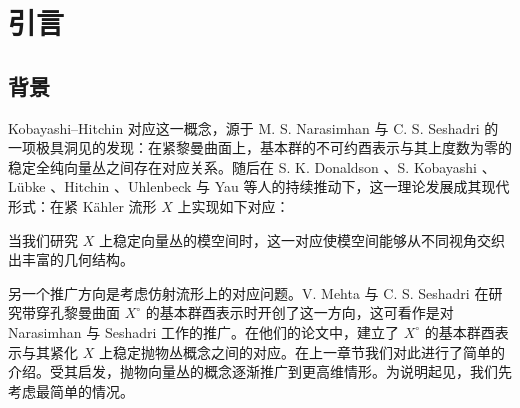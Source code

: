 \chapter{引言}
\section{背景}

Kobayashi--Hitchin 对应这一概念，源于 M. S. Narasimhan 与 C. S. Seshadri \cite{Na-Se} 的一项极具洞见的发现：在紧黎曼曲面上，基本群的不可约酉表示与其上度数为零的稳定全纯向量丛之间存在对应关系。随后在 S. K. Donaldson \cite{Do1,Do2}、S. Kobayashi \cite{Ko1,Ko2}、L\"ubke \cite{Lu}、Hitchin \cite{Hc}、Uhlenbeck 与 Yau \cite{Uh-Yau} 等人的持续推动下，这一理论发展成其现代形式：在紧 Kähler 流形 \(X\) 上实现如下对应：
\vspace{1pt}
\begin{center}
\end{center}
\vspace{1pt}
当我们研究 \(X\) 上稳定向量丛的模空间时，这一对应使模空间能够从不同视角交织出丰富的几何结构。

另一个推广方向是考虑仿射流形上的对应问题。V. Mehta 与 C. S. Seshadri \cite{Me-Se} 在研究带穿孔黎曼曲面 \(X^\circ\) 的基本群酉表示时开创了这一方向，这可看作是对 Narasimhan 与 Seshadri \cite{Na-Se} 工作的推广。在他们的论文中，建立了 \(X^\circ\) 的基本群酉表示与其紧化 \(X\) 上稳定抛物丛概念之间的对应。在上一章节我们对此进行了简单的介绍。受其启发，抛物向量丛的概念逐渐推广到更高维情形。为说明起见，我们先考虑最简单的情况。

